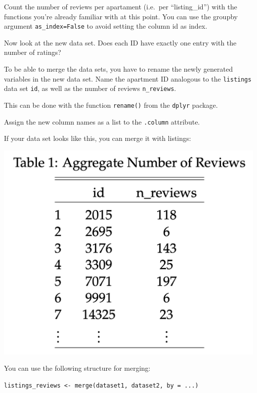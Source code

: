 \documentclass[
  11pt,
]{book}
\newenvironment{tips}[1]
  {
  \begin{itemize}
  \footnotesize
  \renewcommand{\labelitemi}{
    \raisebox{-.7\height}[0pt][0pt]{
      {\setkeys{Gin}{width=3em,keepaspectratio}
        \texttt{[image: images/\#1.png]}}
    }
  }
  \setlength{\fboxsep}{1em}
  \begin{rbox}
  \item
  }
  {
  \end{rbox}
  \end{itemize}
  }
\newenvironment{tipsp}[1]
  {
  \begin{itemize}
  \footnotesize
  \renewcommand{\labelitemi}{
    \raisebox{-.7\height}[0pt][0pt]{
      {\setkeys{Gin}{width=3em,keepaspectratio}
        \texttt{[image: images/\#1.png]}}
    }
  }
  \setlength{\fboxsep}{1em}
  \begin{pbox}
  \item
  }
  {
  \end{pbox}
  \end{itemize}
  }
\begin{document}
\begin{tipsp}p

Count the number of reviews per apartament (i.e.~per ``listing\_id'') with the functions you're already familiar with at this point. You can use the groupby argument \texttt{as\_index=False} to avoid setting the column id as index.

\end{tipsp}

Now look at the new data set. Does each ID have exactly one entry with the number of ratings?

To be able to merge the data sets, you have to rename the newly generated variables in the new data set. Name the apartment ID analogous to the \texttt{listings} data set \texttt{id}, as well as the number of reviews \texttt{n\_reviews}.

\begin{tips}r

This can be done with the function \texttt{rename()} from the \texttt{dplyr} package.

\end{tips}

\begin{tipsp}p

Assign the new column names as a list to the \texttt{.column} attribute.

\end{tipsp}

If your data set looks like this, you can merge it with listings:

\begin{center}\includegraphics[width=0.4\linewidth]{plot/2_merging_table} \end{center}

\begin{tips}r

You can use the following structure for merging:

\texttt{listings\_reviews\ \textless{}-\ merge(dataset1,\ dataset2,\ by\ =\ ...)}

\end{tips}
\end{document}
